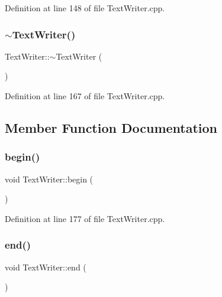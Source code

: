 Definition at line 148 of file Text\+Writer.\+cpp.

\mbox{\label{class_text_writer_aab0c50e9ffcd9fe2797753b222ad1641}} 
\subsubsection{\texorpdfstring{$\sim$\+Text\+Writer()}{~TextWriter()}}
{\footnotesize\ttfamily Text\+Writer\+::$\sim$\+Text\+Writer (\begin{DoxyParamCaption}{ }\end{DoxyParamCaption})}



Definition at line 167 of file Text\+Writer.\+cpp.



\subsection{Member Function Documentation}
\mbox{\label{class_text_writer_aa120043668d4eba84d41222c0dbd3b86}} 
\subsubsection{\texorpdfstring{begin()}{begin()}}
{\footnotesize\ttfamily void Text\+Writer\+::begin (\begin{DoxyParamCaption}{ }\end{DoxyParamCaption})}



Definition at line 177 of file Text\+Writer.\+cpp.

\mbox{\label{class_text_writer_a725e9275d2826c823947e790611ad9ca}} 
\subsubsection{\texorpdfstring{end()}{end()}}
{\footnotesize\ttfamily void Text\+Writer\+::end (\begin{DoxyParamCaption}{ }\end{DoxyParamCaption})}



